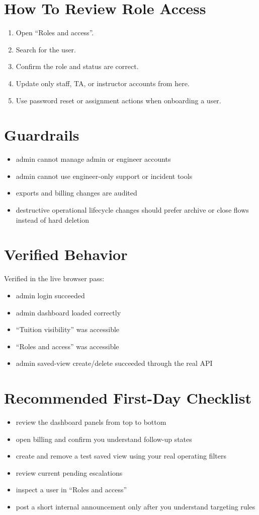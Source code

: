 \documentclass[11pt]{article}
\begin{document}
\section*{How To Review Role Access}
\begin{enumerate}
  \item Open ``Roles and access''.
  \item Search for the user.
  \item Confirm the role and status are correct.
  \item Update only staff, TA, or instructor accounts from here.
  \item Use password reset or assignment actions when onboarding a user.
\end{enumerate}

\section*{Guardrails}
\begin{itemize}
  \item admin cannot manage admin or engineer accounts
  \item admin cannot use engineer-only support or incident tools
  \item exports and billing changes are audited
  \item destructive operational lifecycle changes should prefer archive or close flows instead of hard deletion
\end{itemize}

\section*{Verified Behavior}
Verified in the live browser pass:
\begin{itemize}
  \item admin login succeeded
  \item admin dashboard loaded correctly
  \item ``Tuition visibility'' was accessible
  \item ``Roles and access'' was accessible
  \item admin saved-view create/delete succeeded through the real API
\end{itemize}

\section*{Recommended First-Day Checklist}
\begin{itemize}
  \item review the dashboard panels from top to bottom
  \item open billing and confirm you understand follow-up states
  \item create and remove a test saved view using your real operating filters
  \item review current pending escalations
  \item inspect a user in ``Roles and access''
  \item post a short internal announcement only after you understand targeting rules
\end{itemize}
\end{document}

